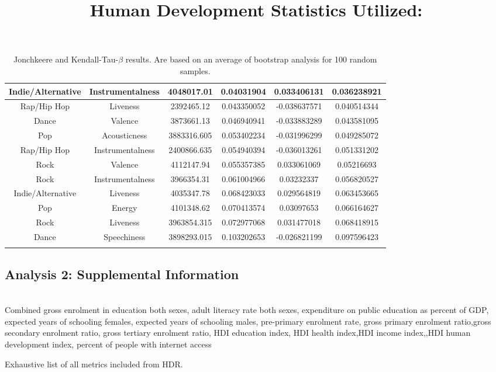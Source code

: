 \documentclass[a4paper]{article}
\begin{document}
\begin{table}[h!]
\begin{longtable}{|c|c|c|c|c|c|}
Indie/Alternative & Instrumentalness & 4048017.01 & 0.04031904 & 0.033406131 & 0.036238921 \\ \hline
Rap/Hip Hop & Liveness & 2392465.12 & 0.043350052 & -0.038637571 & 0.040514344 \\ \hline
Dance & Valence & 3873661.13 & 0.046940941 & -0.033883289 & 0.043581095 \\ \hline
Pop & Acousticness & 3883316.605 & 0.053402234 & -0.031996299 & 0.049285072 \\ \hline
Rap/Hip Hop & Instrumentalness & 2400866.635 & 0.054940394 & -0.036013261 & 0.051331202 \\ \hline
Rock & Valence & 4112147.94 & 0.055357385 & 0.033061069 & 0.05216693 \\ \hline
Rock & Instrumentalness & 3966354.31 & 0.061004966 & 0.03232337 & 0.056820527 \\ \hline
Indie/Alternative & Liveness & 4035347.78 & 0.068423033 & 0.029564819 & 0.063453665 \\ \hline
Pop & Energy & 4101348.62 & 0.070413574 & 0.03097653 & 0.066164627 \\ \hline
Rock & Liveness & 3963854.315 & 0.072977068 & 0.031477018 & 0.068418915 \\ \hline
Dance & Speechiness & 3898293.015 & 0.103202653 & -0.026821199 & 0.097596423 \\ \hline
\caption[Jonchkheere-Tersptra and Kendall-Tau-$\beta$ results]{Jonchkeere and Kendall-Tau-$\beta$ results. Are based on an average of bootstrap analysis for 100 random samples.}
\label{tab:jk}
\end{longtable}
\end{table}

\newpage
\subsection{Analysis 2: Supplemental Information}

\begin{table}[h!]
\title{Human Development Statistics Utilized:}\\
Combined gross enrolment in education both sexes, adult literacy rate both sexes, expenditure on public education as percent of GDP, expected years of schooling females, expected years of schooling males, pre-primary enrolment rate, gross primary enrolment ratio,gross secondary enrolment ratio, gross tertiary enrolment ratio, HDI education index, HDI health index,HDI income index,,HDI human development index, percent of people with internet access
\caption[HDR Statistics]{Exhaustive list of all metrics included from HDR.}
\end{table}
\end{document}
